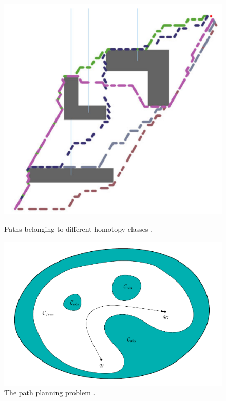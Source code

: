 \message{ !name(proposal.tex)}\documentclass[11pt,twocolumn]{article}
\begin{document}
\begin{figure}[h] \centering
\includegraphics[scale=.2]{homotopy_classes}
  \label{fig:homotopy-classes}
  \caption{Paths belonging to different homotopy classes
\cite{bhattacharyaPathHomotopyInvariants2018}.}
\end{figure}

\begin{figure}[h] \centering \includegraphics[scale=.25]{cspace}
  \caption{The path planning problem
\cite{lavallePlanningAlgorithms2006}.}
  \label{fig:cspace}
\end{figure}
\end{document}
